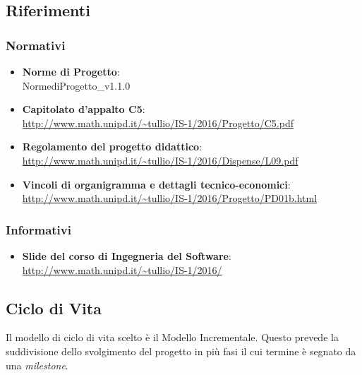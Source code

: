 \subsection{Riferimenti}

\subsubsection{Normativi}
\begin{itemize}
\item \textbf{Norme di Progetto}: \\ NormediProgetto\_v1.1.0
\item \textbf{Capitolato d'appalto C5}: \\ \url{http://www.math.unipd.it/~tullio/IS-1/2016/Progetto/C5.pdf}
\item \textbf{Regolamento del progetto didattico}: \\ \url{http://www.math.unipd.it/~tullio/IS-1/2016/Dispense/L09.pdf}
\item \textbf{Vincoli di organigramma e dettagli tecnico-economici}: \\ \url{http://www.math.unipd.it/~tullio/IS-1/2016/Progetto/PD01b.html}

\end{itemize}


\subsubsection{Informativi}
\begin{itemize}
\item \textbf{Slide del corso di Ingegneria del Software}: \\  \url{http://www.math.unipd.it/~tullio/IS-1/2016/ }
\end{itemize}

\subsection{Ciclo di Vita}

Il modello di ciclo di vita scelto è il Modello Incrementale. Questo prevede la suddivisione dello svolgimento del progetto in più fasi il cui termine è segnato da una \textit{milestone}. \\

